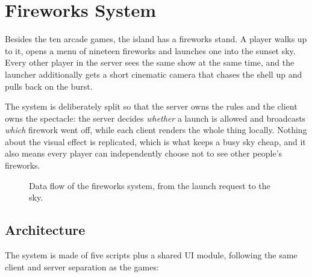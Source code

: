 \documentclass[12pt,letterpaper]{article}
\begin{document}
\section{Fireworks System}

Besides the ten arcade games, the island has a fireworks stand. A player walks up to it, opens a menu of nineteen fireworks and launches one into the sunset sky. Every other player in the server sees the same show at the same time, and the launcher additionally gets a short cinematic camera that chases the shell up and pulls back on the burst.

The system is deliberately split so that the server owns the rules and the client owns the spectacle: the server decides \emph{whether} a launch is allowed and broadcasts \emph{which} firework went off, while each client renders the whole thing locally. Nothing about the visual effect is replicated, which is what keeps a busy sky cheap, and it also means every player can independently choose not to see other people's fireworks.

\begin{figure}[H]
  \centering
  
  \caption{Data flow of the fireworks system, from the launch request to the sky.}
  \label{fig:fireworks_dfd}
\end{figure}

\subsection{Architecture}

The system is made of five scripts plus a shared UI module, following the same client and server separation as the games:
\end{document}
